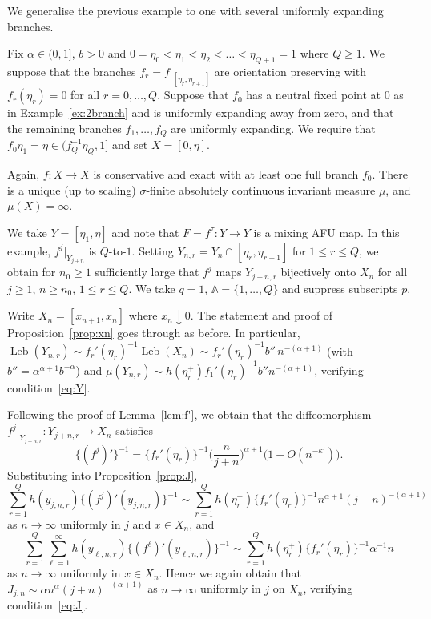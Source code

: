 \documentclass[12pt]{article}
\numberwithin{equation}{section}
\newcommand{\bbA}{{\mathbb A}}
\newcommand{\Leb}{\operatorname{Leb}}
\begin{document}
\begin{example} \label{ex:Qbranch}
We generalise the previous example to one with several uniformly expanding branches.

Fix $\alpha\in(0,1]$, $b>0$ and $0=\eta_0<\eta_1<\eta_2<\dots<\eta_{Q+1}=1$
where ${Q\ge1}$.
We suppose that the branches $f_r=f|_{[\eta_r,\eta_{r+1}]}$ 
are orientation preserving with $f_r(\eta_r)=0$ for all $r=0,\dots,Q$.
Suppose that $f_0$ has a neutral fixed point at $0$ as in Example~\ref{ex:2branch} and is uniformly expanding away from zero, and that the remaining branches $f_1,\dots,f_Q$ are uniformly expanding.
We require that $f_0\eta_1=\eta\in(f_Q^{-1}\eta_Q,1]$ and set $X=[0,\eta]$.

Again, 
$f:X\to X$ is conservative and exact with at least one full branch $f_0$.
There is a 
unique (up to scaling) $\sigma$-finite absolutely continuous invariant measure $\mu$, and $\mu(X)=\infty$.

We take $Y=[\eta_1,\eta]$ and note that $F=f^\tau:Y\to Y$ is a mixing AFU map.
In this example, 
$f^j|_{Y_{j+n}}$ is $Q$-to-$1$.
Setting $Y_{n,r}=Y_n\cap [\eta_r,\eta_{r+1}]$ for $1\le r\le Q$, we obtain for $n_0\ge1$ sufficiently large that $f^j$ maps $Y_{j+n,r}$ bijectively onto $X_n$ for all 
$j\ge1$, $n\ge n_0$, $1\le r\le Q$.
We take $q=1$, $\bbA=\{1,\dots,Q\}$ and suppress subscripts $p$.

Write $X_n=[x_{n+1},x_n]$ where $x_n\downarrow0$.
The statement and proof of Proposition~\ref{prop:xn} goes through as before.
In particular, $\Leb(Y_{n,r})\sim f_r'(\eta_r)^{-1}\Leb(X_n)\sim 
f_r'(\eta_r)^{-1} b''\,n^{-(\alpha+1)}$ 
(with $b''=\alpha^{\alpha+1}b^{-\alpha}$)
and 
$\mu(Y_{n,r})
\sim 
 h(\eta_r^+) f_1'(\eta_r)^{-1} b''
n^{-(\alpha+1)}$,
verifying condition~\eqref{eq:Y}.

Following the proof of Lemma~\ref{lem:f'}, we obtain that
the diffeomorphism $f^j|_{Y_{j+n,r}}:Y_{j+n,r}\to X_n$ satisfies
\[
	\{(f^j)'\}^{-1}= \{f_r'(\eta_r)\}^{-1} \Big(\frac{n}{j+n}\Big)^{\alpha+1}\big(1+O(n^{-\kappa'})\big).
\]
Substituting into Proposition~\ref{prop:J},
\[
\sum_{r=1}^Q h(y_{j,n,r})\{(f^j)'(y_{j,n,r})\}^{-1}\sim \sum_{r=1}^Q h(\eta_r^+)\{f_r'(\eta_r)\}^{-1}n^{\alpha+1}(j+n)^{-(\alpha+1)}
\]
as $n\to\infty$ uniformly in $j$ and $x\in X_n$, and
\[
\sum_{r=1}^Q\sum_{\ell=1}^\infty h(y_{\ell,n,r})\{(f^\ell)'(y_{\ell,n,r})\}^{-1}
\sim \sum_{r=1}^Q h(\eta_r^+)\{f_r'(\eta_r)\}^{-1}\alpha^{-1}n
\]
as $n\to\infty$ uniformly in $x\in X_n$.
Hence we again obtain that
$J_{j,n}\sim \alpha n^\alpha(j+n)^{-(\alpha+1)}$ as $n\to\infty$ uniformly in $j$ on $X_n$, verifying condition~\eqref{eq:J}.
\end{example}
\end{document}
